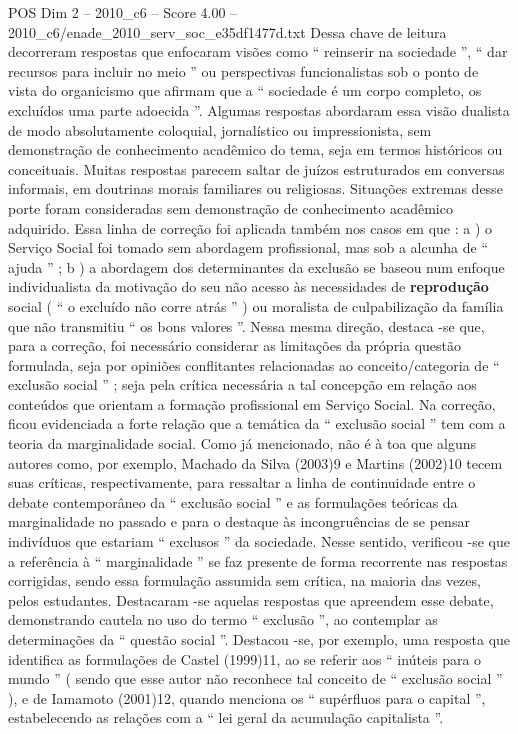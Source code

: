 \begin{textsample}{POS Dim 2 – 2010\_c6 – Score 4.00 – 2010\_c6/enade\_2010\_serv\_soc\_e35df1477d.txt}
Dessa chave de leitura decorreram respostas que enfocaram visões como “ reinserir na sociedade ”, “ dar recursos para incluir no meio ” ou perspectivas funcionalistas sob o ponto de vista do organicismo que afirmam que a “ sociedade é um corpo completo, os excluídos uma parte adoecida ”.
Algumas respostas abordaram essa visão dualista de modo absolutamente coloquial, jornalístico ou impressionista, sem demonstração de conhecimento acadêmico do tema, seja em termos históricos ou conceituais.
Muitas respostas parecem saltar de juízos estruturados em conversas informais, em doutrinas morais familiares ou religiosas.
Situações extremas desse porte foram consideradas sem demonstração de conhecimento acadêmico adquirido.
Essa linha de correção foi aplicada também nos casos em que : a ) o Serviço Social foi tomado sem abordagem profissional, mas sob a alcunha de “ ajuda ” ; b ) a abordagem dos determinantes da exclusão se baseou num enfoque individualista da motivação do seu não acesso às necessidades de \textbf{reprodução} social ( “ o excluído não corre atrás ” ) ou moralista de culpabilização da família que não transmitiu “ os bons valores ”.
Nessa mesma direção, destaca -se que, para a correção, foi necessário considerar as limitações da própria questão formulada, seja por opiniões conflitantes relacionadas ao conceito/categoria de “ exclusão social ” ; seja pela crítica necessária a tal concepção em relação aos conteúdos que orientam a formação profissional em Serviço Social.
Na correção, ficou evidenciada a forte relação que a temática da “ exclusão social ” tem com a teoria da marginalidade social.
Como já mencionado, não é à toa que alguns autores como, por exemplo, Machado da Silva (2003)9 e Martins (2002)10 tecem suas críticas, respectivamente, para ressaltar a linha de continuidade entre o debate contemporâneo da “ exclusão social ” e as formulações teóricas da marginalidade no passado e para o destaque às incongruências de se pensar indivíduos que estariam “ exclusos ” da sociedade.
Nesse sentido, verificou -se que a referência à “ marginalidade ” se faz presente de forma recorrente nas respostas corrigidas, sendo essa formulação assumida sem crítica, na maioria das vezes, pelos estudantes.
Destacaram -se aquelas respostas que apreendem esse debate, demonstrando cautela no uso do termo “ exclusão ”, ao contemplar as determinações da “ questão social ”.
Destacou -se, por exemplo, uma resposta que identifica as formulações de Castel (1999)11, ao se referir aos “ inúteis para o mundo ” ( sendo que esse autor não reconhece tal conceito de “ exclusão social ” ), e de Iamamoto (2001)12, quando menciona os “ supérfluos para o capital ”, estabelecendo as relações com a “ lei geral da acumulação capitalista ”.

\end{textsample}
